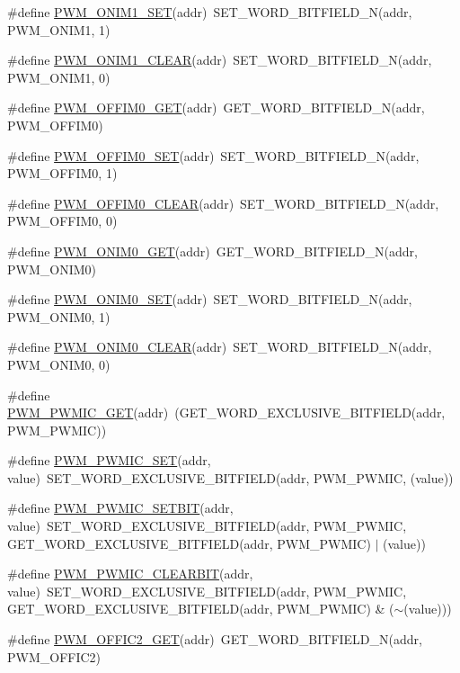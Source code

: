 \begin{DoxyCompactItemize}
\item 
\#define \hyperlink{a00564_a49725b8d2710967e8290a9af796be5f8}{PWM\_\-ONIM1\_\-SET}(addr)~SET\_\-WORD\_\-BITFIELD\_\-N(addr, PWM\_\-ONIM1, 1)
\item 
\#define \hyperlink{a00564_a1af2b52371baac8cd1da572d75c1c77a}{PWM\_\-ONIM1\_\-CLEAR}(addr)~SET\_\-WORD\_\-BITFIELD\_\-N(addr, PWM\_\-ONIM1, 0)
\item 
\#define \hyperlink{a00564_a966bac96f84175156beca44f9c6a9d9c}{PWM\_\-OFFIM0\_\-GET}(addr)~GET\_\-WORD\_\-BITFIELD\_\-N(addr, PWM\_\-OFFIM0)
\item 
\#define \hyperlink{a00564_a5fbfce9dce7d28867a9e5a75fbdeddac}{PWM\_\-OFFIM0\_\-SET}(addr)~SET\_\-WORD\_\-BITFIELD\_\-N(addr, PWM\_\-OFFIM0, 1)
\item 
\#define \hyperlink{a00564_a38641f9f624ed70d84c1064309573174}{PWM\_\-OFFIM0\_\-CLEAR}(addr)~SET\_\-WORD\_\-BITFIELD\_\-N(addr, PWM\_\-OFFIM0, 0)
\item 
\#define \hyperlink{a00564_abd847fa0b251340bd92912f9455304b4}{PWM\_\-ONIM0\_\-GET}(addr)~GET\_\-WORD\_\-BITFIELD\_\-N(addr, PWM\_\-ONIM0)
\item 
\#define \hyperlink{a00564_a11c00c0e5b95ea29321b2735e57bb0c5}{PWM\_\-ONIM0\_\-SET}(addr)~SET\_\-WORD\_\-BITFIELD\_\-N(addr, PWM\_\-ONIM0, 1)
\item 
\#define \hyperlink{a00564_a2c393cdedfb3d39b190499ac83d0fad0}{PWM\_\-ONIM0\_\-CLEAR}(addr)~SET\_\-WORD\_\-BITFIELD\_\-N(addr, PWM\_\-ONIM0, 0)
\item 
\#define \hyperlink{a00564_ab988f3432631a858b256f9e4f6ab6aaf}{PWM\_\-PWMIC\_\-GET}(addr)~(GET\_\-WORD\_\-EXCLUSIVE\_\-BITFIELD(addr, PWM\_\-PWMIC))
\item 
\#define \hyperlink{a00564_a7c2dc5fdb484679748ca37d54cc41700}{PWM\_\-PWMIC\_\-SET}(addr, value)~SET\_\-WORD\_\-EXCLUSIVE\_\-BITFIELD(addr, PWM\_\-PWMIC, (value))
\item 
\#define \hyperlink{a00564_aaab2a23f2b8e3cbf04055b9634f1bdfb}{PWM\_\-PWMIC\_\-SETBIT}(addr, value)~SET\_\-WORD\_\-EXCLUSIVE\_\-BITFIELD(addr, PWM\_\-PWMIC, GET\_\-WORD\_\-EXCLUSIVE\_\-BITFIELD(addr, PWM\_\-PWMIC) $|$ (value))
\item 
\#define \hyperlink{a00564_a91c4dd08ef9ee509cd6e262b30ac1d7a}{PWM\_\-PWMIC\_\-CLEARBIT}(addr, value)~SET\_\-WORD\_\-EXCLUSIVE\_\-BITFIELD(addr, PWM\_\-PWMIC, GET\_\-WORD\_\-EXCLUSIVE\_\-BITFIELD(addr, PWM\_\-PWMIC) \& ($\sim$(value)))
\item 
\#define \hyperlink{a00564_ae3131268199fa291039ff5ab10c7f6f2}{PWM\_\-OFFIC2\_\-GET}(addr)~GET\_\-WORD\_\-BITFIELD\_\-N(addr, PWM\_\-OFFIC2)

\end{DoxyCompactItemize}
